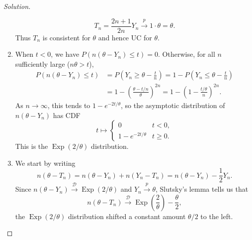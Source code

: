 \documentclass{article}
\begin{document}
\begin{proof}[Solution]
\begin{enumerate}[label=(\alph*)]
\begin{equation*}
T_n = \frac{2n + 1}{2n}Y_n\stackrel{p}{\longrightarrow} 1\cdot\theta = \theta.
\end{equation*}
Thus $T_n$ is consistent for $\theta$ and hence UC for $\theta$.
\item When $t < 0$, we have $P(n(\theta - Y_n)\leq t) = 0$. Otherwise, for all $n$ sufficiently large ($n\theta > t$),
\begin{align*}
P(n(\theta - Y_n)\leq t) &= P\left(Y_n\geq\theta - \frac{t}{n}\right) = 1 - P\left(Y_n\leq\theta - \frac{t}{n}\right) \\
&= 1 - \left(\frac{\theta - t/n}{\theta}\right)^{2n} = 1 - \left(1 - \frac{t/\theta}{n}\right)^{2n}.
\end{align*}
As $n\to\infty$, this tends to $1 - e^{-2t/\theta}$, so the asymptotic distribution of $n(\theta - Y_n)$ has CDF
\begin{equation*}
t\longmapsto \begin{cases} 0 & t < 0, \\ 1 - e^{-2t/\theta} & t\geq 0. \end{cases}
\end{equation*}
This is the $\operatorname{Exp}(2/\theta)$ distribution.
\item We start by writing
\begin{equation*}
n(\theta - T_n) = n(\theta - Y_n) + n(Y_n - T_n) = n(\theta - Y_n) - \frac{1}{2}Y_n.
\end{equation*}
Since $n(\theta - Y_n)\stackrel{\mathcal{D}}{\to}\operatorname{Exp}(2/\theta)$ and $Y_n\stackrel{p}{\to}\theta$, Slutsky's lemma tells us that
\begin{equation*}
n(\theta - T_n)\stackrel{\mathcal{D}}{\longrightarrow}\operatorname{Exp}\left(\frac{2}{\theta}\right) - \frac{\theta}{2},
\end{equation*}
the $\operatorname{Exp}(2/\theta)$ distribution shifted a constant amount $\theta/2$ to the left.
\end{enumerate}
\end{proof}
\end{document}
